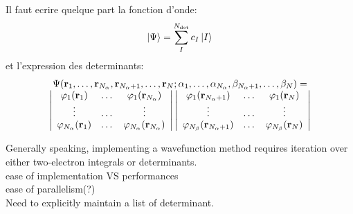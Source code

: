 \documentclass[./thesis.tex]{subfiles}
\begin{document}
\alert{ Il faut ecrire quelque part la fonction d'onde:
$$ \ket{\Psi} = \sum_I^{N_\text{det}} c_I {\ket*{I}} $$
et l'expression des determinants:
\begin{equation}
\begin{array}{c}
 \Psi({\bf r}_1,\dots,{\bf r}_{{N_\alpha}},{\bf r}_{{N_\alpha}+1},\dots,{\bf r}_N;
      \alpha_1,\dots,\alpha_{{N_\alpha}},\beta_{{N_\alpha}+1},\dots,\beta_N) = \\
\left|
 \begin{array}{ccc}
 \varphi_1({\bf r}_1) & \dots & \varphi_1({\bf r}_{{N_\alpha}}) \\
 \vdots               & \dots &   \vdots             \\
 \varphi_{{N_\alpha}}({\bf r}_1) & \dots & \varphi_{{N_\alpha}}({\bf r}_{{N_\alpha}}) \\
 \end{array}
\right|
\left|
 \begin{array}{ccc}
 \varphi_1({\bf r}_{{N_\alpha}+1}) & \dots & \varphi_1({\bf r}_{N}) \\
 \vdots               & \dots &   \vdots             \\
 \varphi_{N_\beta}({\bf r}_{{N_\alpha}+1}) & \dots & \varphi_{N_\beta}({\bf r}_{N}) \\
 \end{array}
\right|
\end{array} 
\label{eq:slater}
\end{equation}
}

Generally speaking, implementing a wavefunction method requires iteration over either two-electron integrals or determinants. \\
ease of implementation VS performances \\
ease of parallelism(?) \\
Need to explicitly maintain a list of determinant. \\
\end{document}

